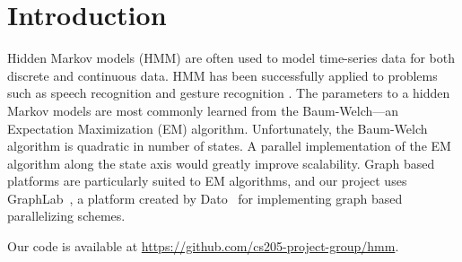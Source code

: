 \section{Introduction}

Hidden Markov models (HMM) are often used to model time-series data for both
discrete and continuous data. HMM has been successfully applied to problems such as speech recognition \cite{hmm-speech} and gesture recognition \cite{hmm-gesture}. The
parameters to a hidden Markov models are most commonly learned from the
Baum-Welch---an Expectation Maximization (EM) algorithm. Unfortunately, the
Baum-Welch algorithm is quadratic in number of states. A parallel implementation
of the EM algorithm along the state axis would greatly improve scalability.
Graph based platforms are particularly suited to EM algorithms, and our project
uses GraphLab~\cite{graphlab}, a platform created by Dato~\cite{dato} for implementing graph based parallelizing schemes. 

Our code is available at
\url{https://github.com/cs205-project-group/hmm}.
